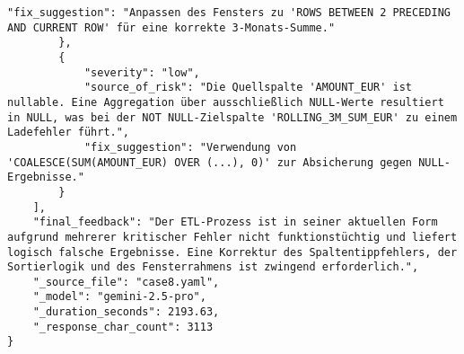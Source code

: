\begin{lstlisting}[caption={Ausgabe: GEMINI 2.5 Pro Anwendungsfall 8 Konsistenzdurchlauf},label={gemini_case8_prompt2}]
            "fix_suggestion": "Anpassen des Fensters zu 'ROWS BETWEEN 2 PRECEDING AND CURRENT ROW' für eine korrekte 3-Monats-Summe."
        },
        {
            "severity": "low",
            "source_of_risk": "Die Quellspalte 'AMOUNT_EUR' ist nullable. Eine Aggregation über ausschließlich NULL-Werte resultiert in NULL, was bei der NOT NULL-Zielspalte 'ROLLING_3M_SUM_EUR' zu einem Ladefehler führt.",
            "fix_suggestion": "Verwendung von 'COALESCE(SUM(AMOUNT_EUR) OVER (...), 0)' zur Absicherung gegen NULL-Ergebnisse."
        }
    ],
    "final_feedback": "Der ETL-Prozess ist in seiner aktuellen Form aufgrund mehrerer kritischer Fehler nicht funktionstüchtig und liefert logisch falsche Ergebnisse. Eine Korrektur des Spaltentippfehlers, der Sortierlogik und des Fensterrahmens ist zwingend erforderlich.",
    "_source_file": "case8.yaml",
    "_model": "gemini-2.5-pro",
    "_duration_seconds": 2193.63,
    "_response_char_count": 3113
}
\end{lstlisting}

